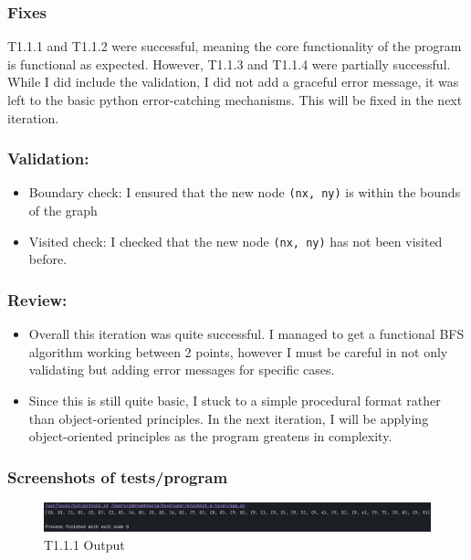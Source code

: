 \subsubsection{Fixes}
T1.1.1 and T1.1.2 were successful, meaning the core functionality of the program is functional as expected. However, T1.1.3 and T1.1.4 were partially successful. While I did include the validation, I did not add a graceful error message, it was left to the basic python error-catching mechanisms. This will be fixed in the next iteration.

\subsubsection{Validation:}
\begin{itemize}
	\item Boundary check: I ensured that the new node \verb|(nx, ny)| is within the bounds of the graph
	\item Visited check: I checked that the new node \verb|(nx, ny)| has not been visited before.
\end{itemize}


\subsubsection{Review:}
\begin{itemize}
	\item Overall this iteration was quite successful. I managed to get a functional BFS algorithm working between 2 points, however I must be careful in not only validating but adding error messages for specific cases.
	\item Since this is still quite basic, I stuck to a simple procedural format rather than object-oriented principles. In the next iteration, I will be applying object-oriented principles as the program greatens in complexity.
\end{itemize}

\newpage

\subsubsection{Screenshots of tests/program}

\begin{figure}[htbp!]
    \centering
    \includegraphics[width=1\linewidth]{Images/t1.1.png}
    \caption{T1.1.1 Output}
    \label{fig:enter-label}
\end{figure}

